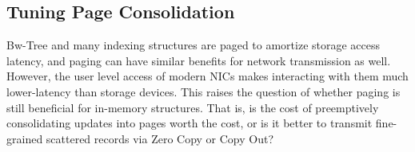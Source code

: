 
\subsection{Tuning Page Consolidation}
\label{sec:consolidation}


Bw-Tree and many indexing structures are paged to amortize storage
access latency, and paging can have similar benefits for network transmission
as well. However, the user level access of modern NICs makes interacting with
them much lower-latency than storage devices. This raises the question of
whether paging is still beneficial for in-memory structures. That is, is the
cost of preemptively consolidating updates into pages worth the cost, or is it
better to transmit fine-grained scattered records via Zero Copy or Copy Out?

%



